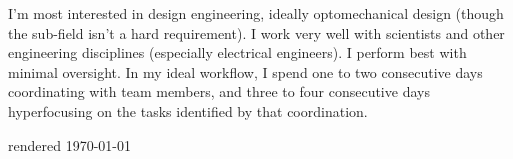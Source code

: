     I'm most interested in design engineering, ideally optomechanical design (though the sub-field isn't a hard requirement).
    I work very well with scientists and other engineering disciplines (especially electrical engineers).
    I perform best with minimal oversight.
    In my ideal workflow, I spend one to two consecutive days coordinating with team members, 
    and three to four consecutive days hyperfocusing on the tasks identified by that coordination.

\vfill
\centering rendered \today


